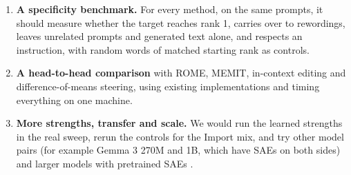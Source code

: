 \begin{enumerate}
  \item \textbf{A specificity benchmark.} For every method, on the same prompts, it should measure whether the target reaches rank 1, carries over to rewordings, leaves unrelated prompts and generated text alone, and respects an instruction, with random words of matched starting rank as controls.
  \item \textbf{A head-to-head comparison} with ROME, MEMIT, in-context editing and difference-of-means steering, using existing implementations \cite{r32} and timing everything on one machine.
  \item \textbf{More strengths, transfer and scale.} We would run the learned strengths in the real sweep, rerun the controls for the Import mix, and try other model pairs (for example Gemma 3 270M and 1B, which have SAEs on both sides) and larger models with pretrained SAEs \cite{r19}.
\end{enumerate}
